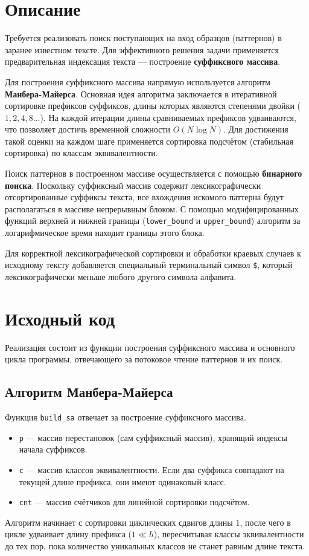 \section{Описание}

Требуется реализовать поиск поступающих на вход образцов (паттернов) в заранее известном тексте. Для эффективного решения задачи применяется предварительная индексация текста — построение \textbf{суффиксного массива}.

Для построения суффиксного массива напрямую используется алгоритм \textbf{Манбера-Майерса}. Основная идея алгоритма заключается в итеративной сортировке префиксов суффиксов, длины которых являются степенями двойки ($1, 2, 4, 8 \dots$). На каждой итерации длины сравниваемых префиксов удваиваются, что позволяет достичь временной сложности $O(N \log N)$. Для достижения такой оценки на каждом шаге применяется сортировка подсчётом (стабильная сортировка) по классам эквивалентности.

Поиск паттернов в построенном массиве осуществляется с помощью \textbf{бинарного поиска}. Поскольку суффиксный массив содержит лексикографически отсортированные суффиксы текста, все вхождения искомого паттерна будут располагаться в массиве непрерывным блоком. С помощью модифицированных функций верхней и нижней границы (\texttt{lower\_bound} и \texttt{upper\_bound}) алгоритм за логарифмическое время находит границы этого блока.

Для корректной лексикографической сортировки и обработки краевых случаев к исходному тексту добавляется специальный терминальный символ \texttt{\$}, который лексикографически меньше любого другого символа алфавита.

\pagebreak

\section{Исходный код}

Реализация состоит из функции построения суффиксного массива и основного цикла программы, отвечающего за потоковое чтение паттернов и их поиск.

\subsection{Алгоритм Манбера-Майерса}

Функция \texttt{build\_sa} отвечает за построение суффиксного массива.
\begin{itemize}
    \item \texttt{p} — массив перестановок (сам суффиксный массив), хранящий индексы начала суффиксов.
    \item \texttt{c} — массив классов эквивалентности. Если два суффикса совпадают на текущей длине префикса, они имеют одинаковый класс.
    \item \texttt{cnt} — массив счётчиков для линейной сортировки подсчётом.
\end{itemize}
Алгоритм начинает с сортировки циклических сдвигов длины 1, после чего в цикле удваивает длину префикса ($1 \ll h$), пересчитывая классы эквивалентности до тех пор, пока количество уникальных классов не станет равным длине текста.

